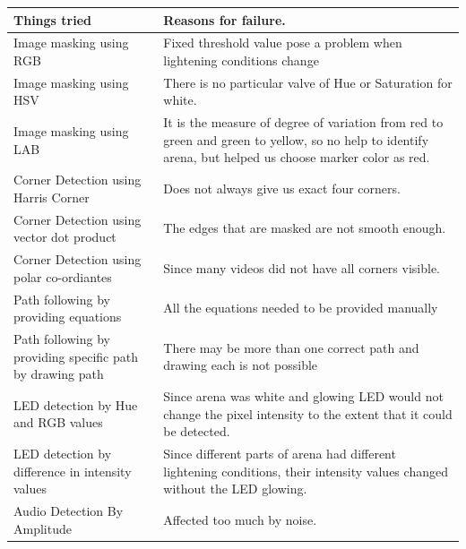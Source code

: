 \documentclass[a4paper,12pt,oneside]{book}
\begin{document}
    \begin{tabulary}{1\textwidth}{|L|L|}
		\hline
		\textbf{Things tried} & \textbf{Reasons for failure. }\\
		\hline
		Image masking using RGB & Fixed threshold value pose a problem when lightening conditions change\\
		\hline
		Image masking using HSV & There is no particular valve of Hue or Saturation for white. \\
		\hline
		Image masking using LAB & It is the measure of degree of variation from red to green and green to yellow, so no help to identify arena, but helped us choose marker color as red. \\
		\hline
		Corner Detection using Harris Corner & Does not always give us exact four corners.\\
		\hline
		Corner Detection using vector dot product & The edges that are masked are not smooth enough.\\
		\hline
		Corner Detection using polar co-ordiantes & Since many videos did not have all corners visible. \\
		\hline
		Path following by providing equations & All the equations needed to be provided manually \\
		\hline
		Path following by providing specific path by drawing path & There may be more than one correct path and drawing each is not possible\\
		\hline
		LED detection by Hue and RGB values & Since arena was white and glowing LED would not change the pixel intensity to the extent that it could be detected.\\
		\hline
		LED detection by difference in intensity values & Since different parts of arena had different lightening conditions, their intensity values changed without the LED glowing.\\
		\hline
		Audio Detection By Amplitude & Affected too much by noise.\\
		\hline		
	\end{tabulary}\\
	
\end{document}
